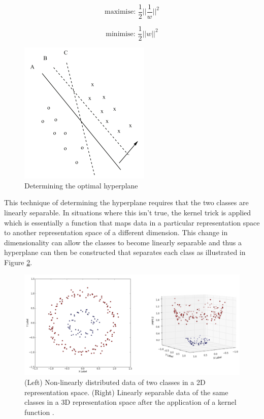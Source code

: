\documentclass[a4paper,twoside,phd]{BYUPhys}
\begin{document}
\begin{equation}
\text{maximise: } \frac{1}{2}||\frac{1}{w}||^2
\label{eq:MaxSVM}
\end{equation}

\begin{equation}
\text{minimise: } \frac{1}{2}||w||^2
\label{eq:MinSVM}
\end{equation}


\begin{figure}[H]
	\centering
	\includegraphics[totalheight=7cm]{images/svm-example.png}
	\caption{Determining the optimal hyperplane \cite{Aggarwal2012}}
	\label{fig:SVMExample}
\end{figure}

This technique of determining the hyperplane requires that the two classes are linearly separable. In situations where this isn't true, the kernel trick \cite{aizerman67theoretical} is applied which is essentially a function that maps data in a particular representation space to another representation space of a different dimension. This change in dimensionality can allow the classes to become linearly separable and thus a hyperplane can then be constructed that separates each class as illustrated in Figure \ref{fig:KernelTrick}.

\begin{figure}[H]
	\centering
	\includegraphics[totalheight=7cm]{images/kernel-trick.png}
	\caption{(Left) Non-linearly distributed data of two classes in a 2D representation space. \newline
		(Right) Linearly separable data of the same classes in a 3D representation space after the application of a kernel function \cite{UnderstandingKernel}.}
	\label{fig:KernelTrick}
\end{figure}
\end{document}
